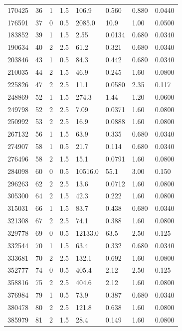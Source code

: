 \documentclass[preview]{standalone}
\begin{document}
{{\begin{tabular}{L{1.2cm}C{1.2cm} C{0.3cm}C{0.5cm} C{1.4cm}C{1.4cm} C{1.4cm}C{1.4cm}}
  170425  &    36  & 1     & 1.5 &  106.9  & 0.560  & 0.880 &  0.0440   \\ 
  176591  &    37  & 0     & 0.5 &  2085.0  & 10.9  & 1.00 &  0.0500   \\ 
  183852  &    39  & 1     & 1.5 &  2.55  & 0.0134  & 0.680 &  0.0340   \\ 
  190634  &    40  & 2     & 2.5 &  61.2  & 0.321  & 0.680 &  0.0340   \\ 
  203846  &    43  & 1     & 0.5 &  84.3  & 0.442  & 0.680 &  0.0340   \\ 
  210035  &    44  & 2     & 1.5 &  46.9  & 0.245  & 1.60 &  0.0800   \\ 
  225826  &    47  & 2     & 2.5 &  11.1  & 0.0580  & 2.35 &  0.117   \\ 
  248869  &    52  & 1     & 1.5 &  274.3  & 1.44  & 1.20 &  0.0600   \\ 
  249798  &    52  & 2     & 2.5 &  7.09  & 0.0371  & 1.60 &  0.0800   \\ 
  250992  &    53  & 2     & 2.5 &  16.9  & 0.0888  & 1.60 &  0.0800   \\ 
  267132  &    56  & 1     & 1.5 &  63.9  & 0.335  & 0.680 &  0.0340   \\ 
  274907  &    58  & 1     & 0.5 &  21.7  & 0.114  & 0.680 &  0.0340   \\ 
  276496  &    58  & 2     & 1.5 &  15.1  & 0.0791  & 1.60 &  0.0800   \\ 
  284098  &    60  & 0     & 0.5 &  10516.0  & 55.1  & 3.00 &  0.150   \\ 
  296263  &    62  & 2     & 2.5 &  13.6  & 0.0712  & 1.60 &  0.0800   \\ 
  305300  &    64  & 2     & 1.5 &  42.3  & 0.222  & 1.60 &  0.0800   \\ 
  315031  &    66  & 1     & 1.5 &  83.7  & 0.438  & 0.680 &  0.0340   \\ 
  321308  &    67  & 2     & 2.5 &  74.1  & 0.388  & 1.60 &  0.0800   \\ 
  329778  &    69  & 0     & 0.5 &  12133.0  & 63.5  & 2.50 &  0.125   \\ 
  332544  &    70  & 1     & 1.5 &  63.4  & 0.332  & 0.680 &  0.0340   \\ 
  333681  &    70  & 2     & 2.5 &  132.1  & 0.692  & 1.60 &  0.0800   \\ 
  352777  &    74  & 0     & 0.5 &  405.4  & 2.12  & 2.50 &  0.125   \\ 
  358816  &    75  & 2     & 2.5 &  404.6  & 2.12  & 1.60 &  0.0800   \\ 
  376984  &    79  & 1     & 0.5 &  73.9  & 0.387  & 0.680 &  0.0340   \\ 
  380478  &    80  & 2     & 2.5 &  121.8  & 0.638  & 1.60 &  0.0800   \\ 
  385979  &    81  & 2     & 1.5 &  28.4  & 0.149  & 1.60 &  0.0800   \\ 
\hline 
\end{tabular} 

}}
\end{document}

